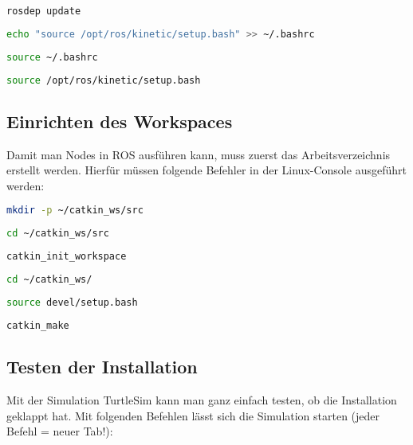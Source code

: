 \begin{lstlisting}[language=bash]
rosdep update
\end{lstlisting}

\begin{lstlisting}[language=bash]
echo "source /opt/ros/kinetic/setup.bash" >> ~/.bashrc
\end{lstlisting}

\begin{lstlisting}[language=bash]
source ~/.bashrc
\end{lstlisting}

\begin{lstlisting}[language=bash]
source /opt/ros/kinetic/setup.bash
\end{lstlisting}

\subsection{Einrichten des Workspaces}
Damit man Nodes in ROS ausführen kann, muss zuerst das Arbeitsverzeichnis erstellt werden. Hierfür müssen folgende Befehler in der Linux-Console ausgeführt werden:
\begin{lstlisting}[language=bash]
mkdir -p ~/catkin_ws/src
\end{lstlisting}

\begin{lstlisting}[language=bash]
cd ~/catkin_ws/src
\end{lstlisting}

\begin{lstlisting}[language=bash]
catkin_init_workspace
\end{lstlisting}

\begin{lstlisting}[language=bash]
cd ~/catkin_ws/
\end{lstlisting}

\begin{lstlisting}[language=bash]
source devel/setup.bash
\end{lstlisting}

\begin{lstlisting}[language=bash]
catkin_make
\end{lstlisting}

\subsection{Testen der Installation}
Mit der Simulation TurtleSim kann man ganz einfach testen, ob die Installation geklappt hat. Mit folgenden Befehlen lässt sich die Simulation starten (jeder Befehl = neuer Tab!):

